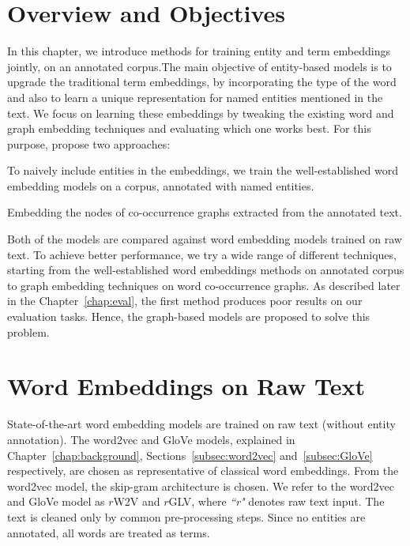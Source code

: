 \section{Overview and Objectives}\label{sec:entity_overview}
In this chapter, we introduce methods for training entity and term embeddings jointly, on an annotated corpus.The main objective of entity-based models is to upgrade the traditional term embeddings, by incorporating the type of the word and also to learn a unique representation for named entities mentioned in the text. We focus on learning these embeddings by tweaking the existing word and graph embedding techniques and evaluating which one works best. For this purpose, propose two approaches: 
\begin{compactenum}
\item To naively include entities in the embeddings, we train the well-established word embedding models on a corpus, annotated with named entities. 
\item Embedding the nodes of co-occurrence graphs extracted from the annotated text. 
\end{compactenum}
Both of the models are compared against word embedding models trained on raw text. To achieve better performance, we try a wide range of different techniques, starting from the well-established word embeddings methods on annotated corpus to graph embedding techniques on word co-occurrence graphs. As described later in the Chapter~\ref{chap:eval}, the first method produces poor results on our evaluation tasks. Hence, the graph-based models are proposed to solve this problem. 
\section{Word Embeddings on Raw Text}\label{sec:raw}
State-of-the-art word embedding models are trained on raw text (without entity annotation). The word2vec and GloVe models, explained in Chapter~\ref{chap:background}, Sections~\ref{subsec:word2vec} and~\ref{subsec:GloVe} respectively, are chosen as representative of classical word embeddings. From the word2vec model, the skip-gram architecture is chosen. We refer to the word2vec and GloVe model as $r$W2V and  $r$GLV, where \emph{``r"} denotes raw text input. The text is cleaned only by common pre-processing steps.  Since no entities are annotated, all words are treated as terms. 
